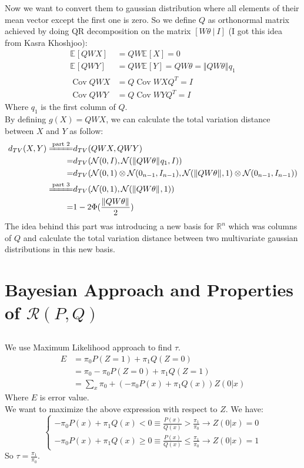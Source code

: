 \documentclass{article}
\numberwithin{equation}{section}
\newcommand{\EX}[2][]{\mathbb{E}_{#1}\left[#2\right]}%
\newcommand{\norm}[2][]{\Vert #2\Vert_{#1}}
\newcommand{\transpose}{^T}
\DeclareMathOperator*{\Cov}{Cov}
\begin{document}
Now we want to convert them to gaussian distribution where all elements of their mean vector except the first one is zero.
So we define \(Q\) as orthonormal matrix achieved by doing QR decomposition on the matrix \(\left[ W\theta\ |\ I \right]\) (I got this idea from Kasra Khoshjoo):
\begin{align}
\EX{QWX} &= QW\EX{X} = 0\\
\EX{QWY} &= QW\EX{Y} = QW\theta = \norm{QW\theta}q_1\\
\Cov{QWX} &= Q \Cov{WX} Q\transpose = I\\
\Cov{QWY} &= Q \Cov{WY} Q\transpose = I
\end{align}
Where \(q_1\) is the first column of \(Q\).\\
By defining \(g(X) = QWX\), we can calculate the total variation distance between \(X\) and \(Y\) as follow:
\begin{align}
d_{TV}(X, Y) \xlongequal{\text{part 2}}& d_{TV}(QWX, QWY)\\
=& d_{TV}(\mathcal{N}(0, I), \mathcal{N}(\norm{QW\theta}q_1, I))\\
=& d_{TV}(\mathcal{N}(0, 1)\otimes \mathcal{N}(0_{n-1}, I_{n-1}), \mathcal{N}(\norm{QW\theta}, 1)\otimes \mathcal{N}(0_{n-1}, I_{n-1}))\\
\xlongequal{\text{part 3}}& d_{TV}(\mathcal{N}(0, 1), \mathcal{N}(\norm{QW\theta}, 1))\\
=& 1 - 2\Phi(\frac{\norm{QW\theta}}{2})
\end{align}
The idea behind this part was introducing a new basis for \(\mathbb{R}^n\) which was columns of \(Q\) and calculate the total variation distance between two multivariate gaussian distributions in this new basis.

\section{Bayesian Approach and Properties of \(\mathcal{R}(P, Q)\)}
\subsection{}
We use Maximum Likelihood approach to find \(\tau\).
\begin{align}
E &= \pi_0 P(Z=1) + \pi_1 Q(Z=0)\\
&= \pi_0 - \pi_0 P(Z=0) + \pi_1 Q(Z=1)\\
&= \sum_x \pi_0 + (-\pi_0 P(x) + \pi_1 Q(x))Z(0|x)
\end{align}
Where \(E\) is error value.\\
We want to maximize the above expression with respect to \(Z\).
We have:
\begin{equation}
\begin{cases}
-\pi_0 P(x) + \pi_1 Q(x) < 0 \equiv \frac{P(x)}{Q(x)} > \frac{\pi_1}{\pi_0} \rightarrow Z(0|x) = 0\\
-\pi_0 P(x) + \pi_1 Q(x) \ge 0 \equiv \frac{P(x)}{Q(x)} \le \frac{\pi_1}{\pi_0} \rightarrow Z(0|x) = 1
\end{cases}
\end{equation}
So \(\tau = \frac{\pi_1}{\pi_0}\).
\end{document}
